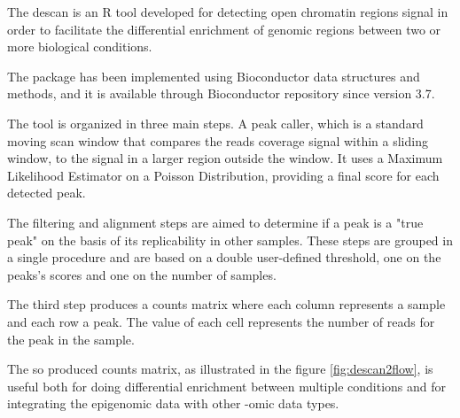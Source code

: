 The \gls{descan} is an R \cite{Ihaka1996} tool developed for detecting open chromatin regions signal in order to facilitate the differential enrichment of genomic regions between two or more biological conditions.

The package has been implemented using Bioconductor \cite{Gentleman2004} data structures and methods, and it is available through Bioconductor repository since version 3.7.

The tool is organized in three main steps. 
A peak caller, which is a standard moving scan window that compares the reads coverage signal within a sliding window, to the signal in a larger region outside the window. It uses a Maximum Likelihood Estimator on a Poisson Distribution, providing a final score for each detected peak.

The filtering and alignment steps are aimed to determine if a peak is a "true peak" on the basis of its replicability in other samples. 
These steps are grouped in a single procedure and are based on a double user-defined threshold, one on the peaks's scores and one on the number of samples.

The third step produces a counts matrix where each column represents a sample and each row a peak. The value of each cell represents the number of reads for the peak in the sample.

The so produced counts matrix, as illustrated in the figure \ref{fig:descan2flow}, is useful both for doing differential enrichment between multiple conditions and for integrating the epigenomic data with other -omic data types.



